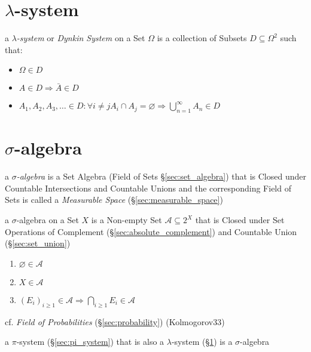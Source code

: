 \section{$\lambda$-system}\label{sec:lambda_system}

a \emph{$\lambda$-system} or \emph{Dynkin System} on a Set $\Omega$ is a
collection of Subsets $D \subseteq \Omega^2$ such that:
\begin{itemize}
  \item $\Omega \in D$
  \item $A \in D \Rightarrow \bar{A} \in D$
  \item $A_1, A_2, A_3, \ldots \in D :
    \forall i \neq jA_i \cap A_j = \varnothing
    \Rightarrow \bigcup_{n=1}^\infty A_n \in D$
\end{itemize}



\section{$\sigma$-algebra}\label{sec:sigma_algebra}

a \emph{$\sigma$-algebra} is a Set Algebra (Field of Sets
\S\ref{sec:set_algebra}) that is Closed under Countable Intersections and
Countable Unions and the corresponding Field of Sets is called a
\emph{Measurable Space} (\S\ref{sec:measurable_space})

a $\sigma$-algebra on a Set $X$ is a Non-empty Set $\mathcal{A} \subseteq 2^X$
that is Closed under Set Operations of Complement
(\S\ref{sec:absolute_complement}) and Countable Union (\S\ref{sec:set_union})

\begin{enumerate}
  \item $\varnothing \in \mathcal{A}$
  \item $X \in \mathcal{A}$
  \item $(E_i)_{i \geq 1} \in \mathcal{A} \Rightarrow
    \bigcap_{i \geq 1} E_i \in \mathcal{A}$
\end{enumerate}

cf. \emph{Field of Probabilities} (\S\ref{sec:probability}) (Kolmogorov33)

a $\pi$-system (\S\ref{sec:pi_system}) that is also a $\lambda$-system
(\S\ref{sec:lambda_system}) is a $\sigma$-algebra

